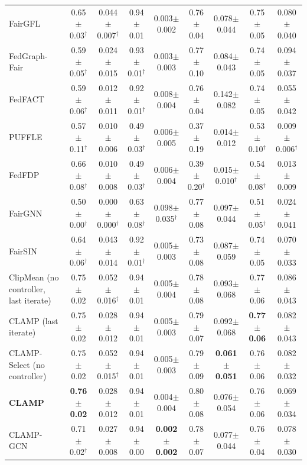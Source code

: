 \begin{table}[t]
{\begin{tabular}{p{2.4cm} cc cc cc cc}
\raggedright FairGFL & 0.65$\pm$0.03$^\dagger$ & 0.044$\pm$0.007$^\dagger$ & 0.94$\pm$0.01 & 0.003$\pm$0.002 & 0.76$\pm$0.04 & 0.078$\pm$0.044 & 0.75$\pm$0.05 & 0.080$\pm$0.040 \\
\raggedright FedGraph-Fair & 0.59$\pm$0.05$^\dagger$ & 0.024$\pm$0.015 & 0.93$\pm$0.01$^\dagger$ & 0.003$\pm$0.003 & 0.77$\pm$0.10 & 0.084$\pm$0.043 & 0.74$\pm$0.05 & 0.094$\pm$0.037 \\
\raggedright FedFACT & 0.59$\pm$0.06$^\dagger$ & 0.012$\pm$0.011 & 0.92$\pm$0.01$^\dagger$ & 0.008$\pm$0.004 & 0.76$\pm$0.04 & 0.142$\pm$0.082 & 0.74$\pm$0.05 & 0.055$\pm$0.042 \\
\raggedright PUFFLE & 0.57$\pm$0.11$^\dagger$ & 0.010$\pm$0.006 & 0.49$\pm$0.03$^\dagger$ & 0.006$\pm$0.005 & 0.37$\pm$0.19 & 0.014$\pm$0.012 & 0.53$\pm$0.10$^\dagger$ & 0.009$\pm$0.006$^\dagger$ \\
\raggedright FedFDP & 0.66$\pm$0.08$^\dagger$ & 0.010$\pm$0.008 & 0.49$\pm$0.03$^\dagger$ & 0.006$\pm$0.004 & 0.39$\pm$0.20$^\dagger$ & 0.015$\pm$0.010$^\dagger$ & 0.54$\pm$0.08$^\dagger$ & 0.013$\pm$0.009 \\
\raggedright FairGNN & 0.50$\pm$0.00$^\dagger$ & 0.000$\pm$0.000$^\dagger$ & 0.63$\pm$0.08$^\dagger$ & 0.098$\pm$0.035$^\dagger$ & 0.77$\pm$0.08 & 0.097$\pm$0.044 & 0.51$\pm$0.05$^\dagger$ & 0.024$\pm$0.041 \\
\raggedright FairSIN & 0.64$\pm$0.06$^\dagger$ & 0.043$\pm$0.014 & 0.92$\pm$0.01$^\dagger$ & 0.005$\pm$0.003 & 0.73$\pm$0.08 & 0.087$\pm$0.059 & 0.74$\pm$0.05 & 0.070$\pm$0.033 \\
\raggedright ClipMean (no controller, last iterate) & 0.75$\pm$0.02 & 0.052$\pm$0.016$^\dagger$ & 0.94$\pm$0.01 & 0.005$\pm$0.004 & 0.78$\pm$0.08 & 0.093$\pm$0.068 & 0.77$\pm$0.06 & 0.086$\pm$0.043 \\
\raggedright CLAMP (last iterate) & 0.75$\pm$0.02 & 0.028$\pm$0.012 & 0.94$\pm$0.01 & 0.005$\pm$0.003 & 0.79$\pm$0.07 & 0.092$\pm$0.068 & \textbf{0.77$\pm$0.06} & 0.082$\pm$0.043 \\
\raggedright CLAMP-Select (no controller) & 0.75$\pm$0.02 & 0.052$\pm$0.015$^\dagger$ & 0.94$\pm$0.01 & 0.005$\pm$0.003 & 0.79$\pm$0.09 & \textbf{0.061$\pm$0.051} & 0.76$\pm$0.06 & 0.082$\pm$0.032 \\
\raggedright \textbf{CLAMP} & \textbf{0.76$\pm$0.02} & 0.028$\pm$0.012 & 0.94$\pm$0.01 & 0.004$\pm$0.004 & 0.80$\pm$0.08 & 0.076$\pm$0.054 & 0.76$\pm$0.06 & 0.069$\pm$0.034 \\
\raggedright CLAMP-GCN & 0.71$\pm$0.02$^\dagger$ & 0.027$\pm$0.008 & 0.94$\pm$0.00 & \textbf{0.002$\pm$0.002} & 0.78$\pm$0.07 & 0.077$\pm$0.044 & 0.76$\pm$0.04 & 0.078$\pm$0.030 \\
\bottomrule
\end{tabular}}
\end{table}
